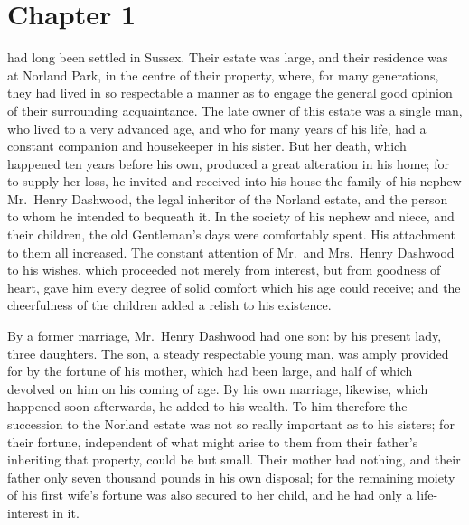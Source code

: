 %
%










\chapter{Chapter 1}


 had long been settled in Sussex.
Their estate was large, and their residence was at Norland Park,
in the centre of their property, where, for many generations,
they had lived in so respectable a manner as to engage
the general good opinion of their surrounding acquaintance.
The late owner of this estate was a single man, who lived
to a very advanced age, and who for many years of his life,
had a constant companion and housekeeper in his sister.
But her death, which happened ten years before his own,
produced a great alteration in his home; for to supply
her loss, he invited and received into his house the family
of his nephew Mr.\ Henry Dashwood, the legal inheritor
of the Norland estate, and the person to whom he intended
to bequeath it.  In the society of his nephew and niece,
and their children, the old Gentleman's days were
comfortably spent.  His attachment to them all increased.
The constant attention of Mr.\ and Mrs.\ Henry Dashwood
to his wishes, which proceeded not merely from interest,
but from goodness of heart, gave him every degree of solid
comfort which his age could receive; and the cheerfulness
of the children added a relish to his existence.

By a former marriage, Mr.\ Henry Dashwood had one
son: by his present lady, three daughters.  The son,
a steady respectable young man, was amply provided
for by the fortune of his mother, which had been large,
and half of which devolved on him on his coming of age.
By his own marriage, likewise, which happened soon afterwards,
he added to his wealth.  To him therefore the succession
to the Norland estate was not so really important as to
his sisters; for their fortune, independent of what might
arise to them from their father's inheriting that property,
could be but small.  Their mother had nothing, and their
father only seven thousand pounds in his own disposal;
for the remaining moiety of his first wife's fortune was
also secured to her child, and he had only a life-interest
in it.

